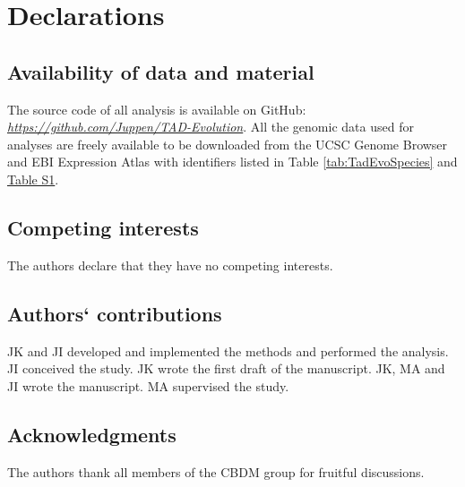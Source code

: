 \documentclass[a4paper,twoside=true,openright,parskip=full,chapterprefix=true,11pt,headings=normal,bibliography=totoc,listof=totoc,titlepage=on,captions=tableabove,draft=false]{scrreprt}
\theoremstyle{definition}
\theoremstyle{definition}
\theoremstyle{definition}
\theoremstyle{remark}
\begin{document}
\hypertarget{declarations}{%
\section*{Declarations}\label{declarations}}

\hypertarget{availability-of-data-and-material}{%
\subsection*{Availability of data and
material}\label{availability-of-data-and-material}}

The source code of all analysis is available on GitHub:
\href{https://github.com/Juppen/TAD-Evolution}{\emph{https://github.com/Juppen/TAD-Evolution}}.
All the genomic data used for analyses are freely available to be
downloaded from the UCSC Genome Browser and EBI Expression Atlas with
identifiers listed in Table \ref{tab:TadEvoSpecies} and
\protect\hyperlink{TadEvoSupTab}{Table S1}.

\hypertarget{competing-interests}{%
\subsection*{Competing interests}\label{competing-interests}}

The authors declare that they have no competing interests.

\hypertarget{authors-contributions}{%
\subsection*{Authors` contributions}\label{authors-contributions}}

JK and JI developed and implemented the methods and performed the
analysis. JI conceived the study. JK wrote the first draft of the
manuscript. JK, MA and JI wrote the manuscript. MA supervised the study.

\hypertarget{acknowledgments}{%
\subsection*{Acknowledgments}\label{acknowledgments}}

The authors thank all members of the CBDM group for fruitful
discussions.
\end{document}
